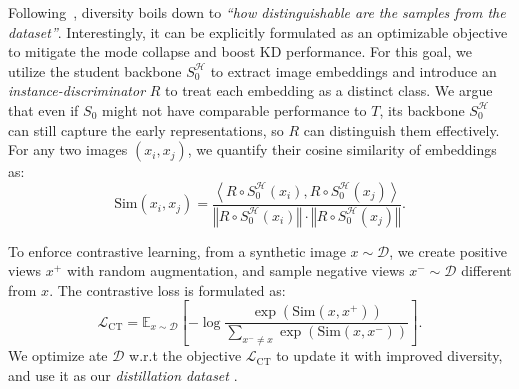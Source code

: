 \begin{foldable} %
    Following~\cite{fang2021contrastive}, diversity boils down to \textit{``how distinguishable are the samples from the dataset''}.
    Interestingly, it can be explicitly formulated as an optimizable objective to mitigate the mode collapse and boost KD performance.
    For this goal, we utilize the student backbone $S_{0}^{\mathcal{H}}$ to extract image embeddings and introduce an \textit{instance-discriminator} $R$ to treat each embedding as a distinct class.
    We argue that even if $S_0$ might not have comparable performance to $T$, its backbone $S_{0}^{\mathcal{H}}$ can still capture the early representations, so $R$ can distinguish them effectively.
    For any two images $(x_i, x_j)$, we quantify their cosine similarity of embeddings as:
    \begin{equation}
        \text{Sim}\left(x_i, x_j\right)=
            \frac{ \left\langle R \circ S_{0}^{\mathcal{H}}\left(x_i\right), R \circ S_{0}^{\mathcal{H}}\left(x_j\right)\right\rangle }
            { \left\Vert R \circ S_{0}^{\mathcal{H}}\left(x_i\right) \right\Vert \cdot\left\Vert R \circ S_{0}^{\mathcal{H}}\left(x_j\right) \right\Vert }.
    \end{equation}
\end{foldable}

\begin{foldable} %
    To enforce contrastive learning, from a synthetic image $x\sim\mathcal{D}$, we create positive views $x^{+}$ with random augmentation, and sample negative views $x^{-}\sim\mathcal{D}$ different from $x$.
    The contrastive loss is formulated as:
    \begin{equation} \label{eq:loss-contrastive}
        \mathcal{L}_{\text{CT}} = \mathbb{E}_{x \sim \mathcal{D}} \left[ -\log \frac{ \exp\left( \text{Sim}(x, x^{+}) \right) }{ \sum_{x^{-} \ne x} \exp\left( \text{Sim}(x, x^{-})  \right) } \right].
    \end{equation}
    We optimize ate $\mathcal{D}$ w.r.t the objective $\mathcal{L}_{\text{CT}}$ to update it with improved diversity, and use it as our \textit{distillation dataset} .
\end{foldable}



